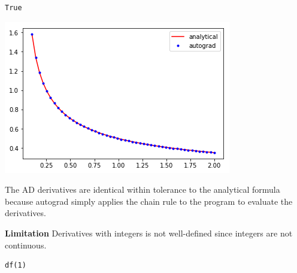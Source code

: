 \documentclass[11pt]{article}
\begin{document}
\begin{verbatim}
True
\end{verbatim}



\begin{center}
\includegraphics[width=.9\linewidth]{obipy-resources/7b778712de6ec6a237e88377d645bb2e-78386dua.png}
\end{center}

The AD derivatives are identical within tolerance to the analytical formula because autograd simply applies the chain rule to the program to evaluate the derivatives.

\textbf{Limitation} Derivatives with integers is not well-defined since integers are not continuous.

\begin{verbatim}
df(1)
\end{verbatim}
\end{document}
